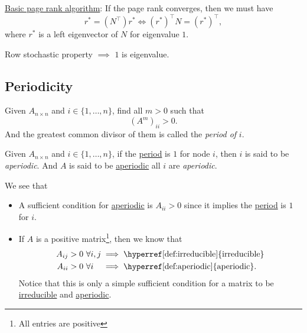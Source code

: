 \begin{prev}
	\hyperref[algo:basic-page-rank-algorithm]{Basic page rank algorithm}: If the page rank converges,
	then we must have
	\[
		r^{\ast} = (N^{\top})r^{\ast} \iff (r^{\ast})^{\top} N = (r^{\ast})^{\top},
	\]
	where \(r^{\ast}\) is a left eigenvector of \(N\) for eigenvalue \(1\).
\end{prev}
\begin{remark}
	Row stochastic property \(\implies\) \(1\) is eigenvalue.
\end{remark}

\subsection{Periodicity}
\begin{definition}[Period]\label{def:period}
	Given \(A_{n\times n}\) and \(i\in\{1, \ldots , n\}\), find all \(m>0\) such that
	\[
		(A^m)_{ii}>0.
	\]
	And the greatest common divisor of them is called the \emph{period of} \(i\).
\end{definition}

\begin{definition}[Aperiodic]\label{def:aperiodic}
	Given \(A_{n\times n}\) and \(i\in\{1, \ldots , n\}\), if the \hyperref[def:period]{period} is \(1\) for node \(i\), then \(i\)
	is said to be \emph{aperiodic}. And \(A\) is said to be \hyperref[def:aperiodic]{aperiodic} all \(i\) are \emph{aperiodic}.
\end{definition}

\begin{remark}\label{rmk:lec11-1}
	We see that
	\begin{itemize}
		\item A sufficient condition for \hyperref[def:aperiodic]{aperiodic} is \(A_{ii} > 0 \) since it implies the \hyperref[def:period]{period} is \(1\) for \(i\).
		\item If \(A\) is a positive matrix\footnote{All entries are positive}, then we know that
		      \[
			      \begin{alignedat}{3}
				      A_{ij}>0\ &\forall i, j &&\implies \text{\hyperref[def:irreducible]{irreducible}}\\
				      A_{ii}>0\ &\forall i &&\implies \text{\hyperref[def:aperiodic]{aperiodic}}.
			      \end{alignedat}
		      \]
		      Notice that this is only a simple sufficient condition for a matrix to be \hyperref[def:irreducible]{irreducible} and \hyperref[def:aperiodic]{aperiodic}.
	\end{itemize}
\end{remark}

